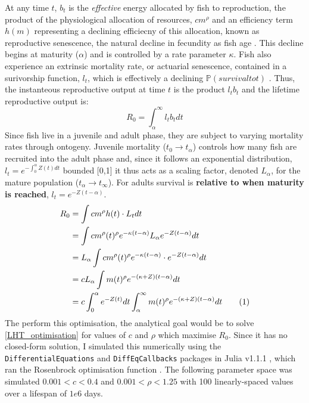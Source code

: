 \documentclass[a4paper]{article} %
\newcommand\numberthis{\addtocounter{equation}{1}\tag{\theequation}}
\begin{document}
At any time $t$, $b_{t}$ is the \textit{effective} energy allocated by fish to reproduction, the product of the physiological allocation of resources, $cm^{\rho}$ and an efficiency term $h(m)$ representing a declining efficiecny of this allocation, known as reproductive senescence, the natural decline in fecundity as fish age \autocite{Stearns2000, Benoit2018, Vrtilek2018}. This decline begins at maturity ($\alpha$) and is controlled by a rate parameter $\kappa$. Fish also experience an extrinsic mortality rate, or actuarial senescence, contained in a surivorship function, $l_t$, which is effectively a declining $\mathbb{P}(survival to t)$ \autocite{Charnov1993, Charnov2001, Benoit2018, Laird2010, Reznick2002, Reznick2006}. Thus, the instanteous reproductive output at time $t$ is the product $l_{t}b_{t}$ and the lifetime reproductive output is:
\begin{equation}
    R_{0} = \int_{\alpha}^{\infty}l_{t}b_{t} dt
\end{equation}
Since fish live in a juvenile and adult phase, they are subject to varying mortality rates through ontogeny. Juvenile mortality ($t_0 \rightarrow t_{\alpha}$) controls how many fish are recruited into the adult phase and, since it follows an exponential distribution, $l_t = e^{-\int_{0}^{\alpha}Z(t)dt}$ bounded [0,1] it thus acts as a scaling factor, denoted $L_{\alpha}$, for the mature population ($t_{\alpha} \rightarrow t_{\infty}$). For adults survival is \textbf{relative to when maturity is reached}, $l_{t} = e^{-Z(t-\alpha)}$.
\begin{align*}
    R_{0} &= \int cm^{\rho}h(t) \cdot L_{t} dt \\
          &= \int cm^{\rho}(t)^{\rho} e^{-\kappa(t-\alpha)} L_{\alpha}e^{-Z(t-\alpha)} dt \\
          &= L_{\alpha}\int cm^{\rho}(t)^{\rho} e^{-\kappa(t-\alpha)} \cdot e^{-Z(t-\alpha)} dt \\
          &= cL_{\alpha}\int m(t)^{\rho} e^{-(\kappa+Z)(t-\alpha)} dt \\
          &= c\int_{0}^{\alpha}e^{-Z(t)}dt\int_{\alpha}^{\infty} m(t)^{\rho} e^{-(\kappa+Z)(t-\alpha)} dt \numberthis \label{LHT_optimisation}
\end{align*}
The perform this optimisation, the analytical goal would be to solve \eqref{LHT_optimisation} for values of $c$ and $\rho$ which maximise $R_0$. Since it has no closed-form solution, I simulated this numerically using the \texttt{DifferentialEquations} and \texttt{DiffEqCallbacks} packages in Julia v1.1.1 \autocite{Bezanson2017}, which ran the Rosenbrock optimisation function \autocite{Rosenbrock1960}. The following parameter space was simulated $0.001 < c < 0.4$ and $0.001 < \rho < 1.25$ with 100 linearly-spaced values over a lifespan of $1e6$ days.
\end{document}

